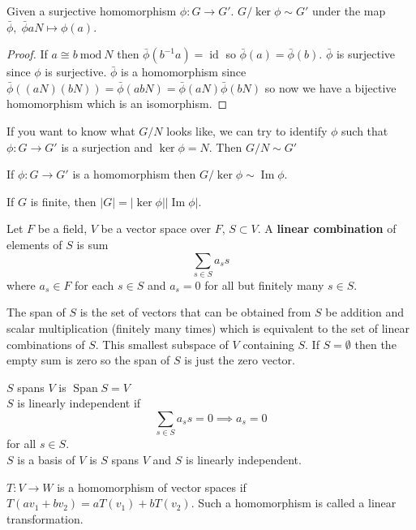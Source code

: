 \documentclass{article}
\newcommand{\vocab}[1]{\textbf{\color{blue!90}\boldmath #1}}
\renewcommand{\Im}{\operatorname{Im}}
\renewcommand{\mod}[1]{\ \text{mod}\ #1}
\newcommand{\ra}[1][]{\xrightarrow{#1}}
\DeclareMathOperator{\id}{id}
\DeclareMathOperator{\Span}{Span}
\begin{document}
\begin{theorem}
Given a surjective homomorphism $\phi:G\ra G'$. $G/\ker\phi\sim G'$ under the map $\bar{\phi},\;\bar{\phi}aN\mapsto\phi(a)$.
\end{theorem}
\begin{proof}
If $a\cong b\mod{N}$ then $\bar{\phi}(b^{-1}a)=\id$ so $\bar{\phi}(a)=\bar{\phi}(b)$. $\bar{\phi}$ is surjective since $\phi$ is surjective. $\bar{\phi}$ is a homomorphism since $\bar{\phi}((aN)(bN))=\bar{\phi}(abN)=\bar{\phi}(aN)\bar{\phi}(bN)$ so now we have a bijective homomorphism which is an isomorphism.
\end{proof}
\begin{fact}
If you want to know what $G/N$ looks like, we can try to identify $\phi$ such that $\phi:G\ra G'$ is a surjection and $\ker\phi=N$. Then $G/N\sim G'$
\end{fact}
\begin{corollary}
If $\phi:G\ra G'$ is a homomorphism then $G/\ker\phi\sim\Im\phi$.
\end{corollary}
\begin{corollary}
If $G$ is finite, then $|G|=|\ker\phi||\Im\phi|$.
\end{corollary}
\begin{definition}
Let $F$ be a field, $V$ be a vector space over $F$, $S\subset V$. A \vocab{linear combination} of elements of $S$ is  sum $$\sum_{s\in S}a_ss$$ where $a_s\in F$ for each $s\in S$ and $a_s=0$ for all but finitely many $s\in S$.
\end{definition}
\begin{definition}[Span $S$]
The span of $S$ is the set of vectors that can be obtained from $S$ be addition and scalar multiplication (finitely many times) which is equivalent to the set of linear combinations of $S$. This smallest subspace of $V$ containing $S$. If $S=\emptyset$ then the empty sum is zero so the span of $S$ is just the zero vector.
\end{definition}
\begin{definition}
$S$ spans $V$ is $\Span S=V$\\
$S$ is linearly independent if $$\sum_{s\in S}a_ss=0\implies a_s=0$$ for all $s\in S$.\\
$S$ is a basis of $V$ is $S$ spans $V$ and $S$ is linearly independent.
\end{definition}
\begin{definition}
$T:V\ra W$ is a homomorphism of vector spaces if $T(av_1+bv_2)=aT(v_1)+bT(v_2)$. Such a homomorphism is called a linear transformation.
\end{definition}
\end{document}
